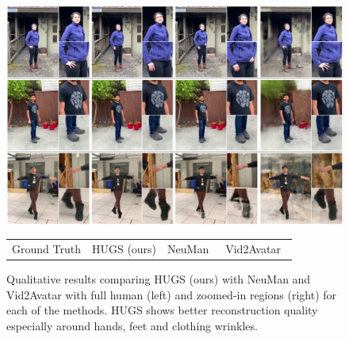 \begin{figure}[t]
    \centering
    \includegraphics[width=\linewidth]{figures/pdf_files/sota_qual.pdf}
    \small
    \begin{tabular}{cccc}
         \quad Ground Truth \qquad \qquad & \qquad \qquad HUGS (ours) \qquad \qquad & \qquad \quad \qquad NeuMan~\cite{jiang2022neuman} \qquad \quad & \qquad \quad \qquad Vid2Avatar~\cite{guo2023vid2avatar} \qquad 
    \end{tabular}
    \vspace{-3mm}
    \caption{Qualitative results comparing HUGS (ours) with NeuMan and Vid2Avatar with full human (left) and zoomed-in regions (right) for each of the methods. HUGS shows better reconstruction quality especially around hands, feet and clothing wrinkles.} 
    \label{fig:qualitative_sota}
\end{figure}{}
